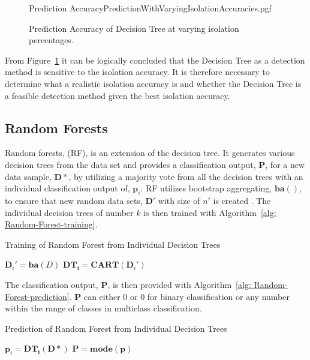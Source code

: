 \begin{figure}[!htb]
	\centering
	{Prediction AccuracyPredictionWithVaryingIsolationAccuracies.pgf}
	
	\caption{Prediction Accuracy of Decision Tree at varying isolation percentages.}
	\label{fig:DecisionTreesWithVaryingIsolationPrediction}
\end{figure}

From Figure~\ref{fig:DecisionTreesWithVaryingIsolationPrediction} it can be logically concluded that the Decision Tree as a detection method is sensitive to the isolation accuracy. It is therefore necessary to determine what a realistic isolation accuracy is and whether the Decision Tree is a feasible detection method given the best isolation accuracy.

\subsection{Random Forests}
Random forests, (RF), is an extension of the decision tree. It generates various decision trees from the data set and provides a classification output, $\mathbf{P}$, for a new data sample, $\mathbf{D}*$, by utilizing a majority vote from all the decision trees with an individual classification output of, $\mathbf{p}_i$. RF utilizes bootstrap aggregating, $\mathbf{ba}()$, to ensure that new random data sets, $\mathbf{D}'$ with size of $n'$ is created \cite{Primartha2018, Paul2018, Shi2006}. The individual decision trees of number $k$ is then trained with Algorithm~\ref{alg: Random-Forest-training}.

\begin{algorithm}[!htb]
	\caption[Random Forest]{Training of Random Forest from Individual Decision Trees}
	\label{alg: Random-Forest-training}
	\begin{algorithmic}[1]
		\State \texttt{$\mathbf{D}_i' = \mathbf{ba}(D)$}
		\State \texttt{$\mathbf{DT_i} = \mathbf{CART}(\mathbf{D}_i')$}
		\EndFor
	\end{algorithmic}
\end{algorithm}
The classification output, $\mathbf{P}$, is then provided with Algorithm~\ref{alg: Random-Forest-prediction}. $\mathbf{P}$ can either $0$ or $0$ for binary classification or any number within the range of classes in multiclass classification.
\begin{algorithm}[!htb]
	\caption[Random Forest]{Prediction of Random Forest from Individual Decision Trees}
	\label{alg: Random-Forest-prediction}
	\begin{algorithmic}[1]
	\State \texttt{$\mathbf{p}_i = \mathbf{DT_i}(\mathbf{D}*)$}
	\EndFor
	\State $\mathbf{P} = \textbf{mode}(\mathbf{p})$
	\end{algorithmic}
\end{algorithm}

